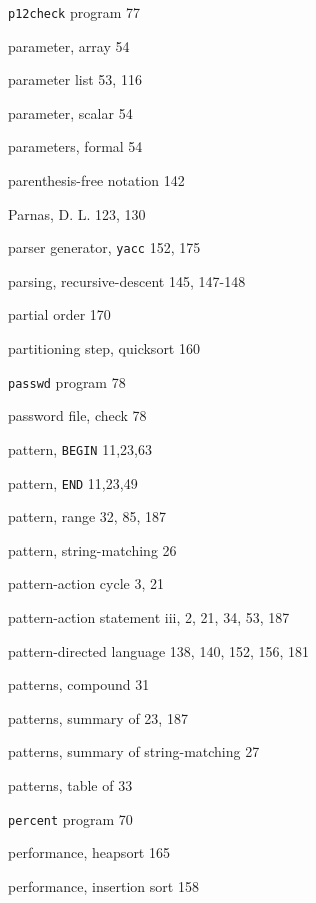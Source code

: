 \begin{multicols}{3}
\hangindent=3pc  \verb'p12check' program 77

\hangindent=3pc  parameter, array 54

\hangindent=3pc  parameter list 53, 116

\hangindent=3pc  parameter, scalar 54

\hangindent=3pc  parameters, formal 54

\hangindent=3pc  parenthesis-free notation 142

\hangindent=3pc  Parnas, D. L. 123, 130

\hangindent=3pc  parser generator, \verb'yacc' 152, 175

\hangindent=3pc  parsing, recursive-descent 145, 147-148

\hangindent=3pc  partial order 170

\hangindent=3pc  partitioning step, quicksort 160

\hangindent=3pc  \verb'passwd' program 78

\hangindent=3pc  password file, check 78

\hangindent=3pc  pattern, \verb'BEGIN' 11,23,63

\hangindent=3pc  pattern, \verb'END' 11,23,49

\hangindent=3pc  pattern, range 32, 85, 187

\hangindent=3pc  pattern, string-matching 26

\hangindent=3pc  pattern-action cycle 3, 21

\hangindent=3pc  pattern-action statement iii, 2, 21, 34, 53, 187

\hangindent=3pc  pattern-directed language 138,  140, 152, 156, 181

\hangindent=3pc  patterns, compound 31

\hangindent=3pc  patterns, summary of 23, 187

\hangindent=3pc  patterns, summary of string-matching 27

\hangindent=3pc  patterns, table of 33

\hangindent=3pc  \verb'percent' program 70

\hangindent=3pc  performance, heapsort 165

\hangindent=3pc  performance, insertion sort 158


\end{multicols}

